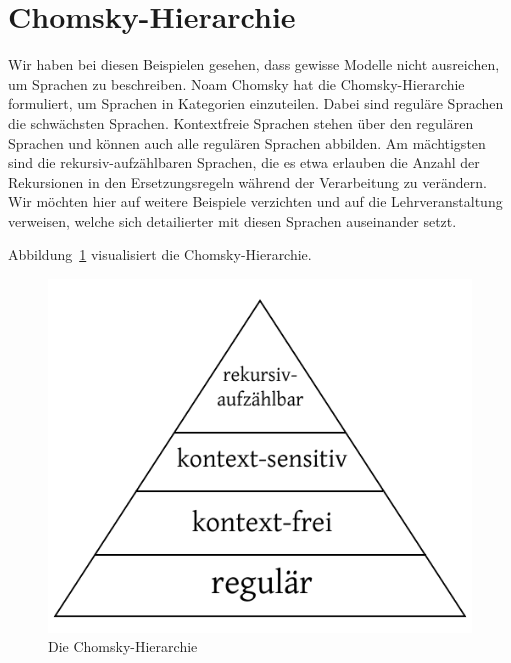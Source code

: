 \section{Chomsky-Hierarchie}
%
Wir haben bei diesen Beispielen gesehen, dass gewisse Modelle nicht ausreichen, um Sprachen zu beschreiben. Noam Chomsky hat die Chomsky-Hierarchie formuliert, um Sprachen in Kategorien einzuteilen. Dabei sind reguläre Sprachen die schwächsten Sprachen. Kontextfreie Sprachen stehen über den regulären Sprachen und können auch alle regulären Sprachen abbilden. Am mächtigsten sind die rekursiv-aufzählbaren Sprachen, die es etwa erlauben die Anzahl der Rekursionen in den Ersetzungsregeln während der Verarbeitung zu verändern. Wir möchten hier auf weitere Beispiele verzichten und auf die Lehrveranstaltung \courseswp{} verweisen, welche sich detailierter mit diesen Sprachen auseinander setzt.

Abbildung~\ref{fig:chomsky_hierarchy} visualisiert die Chomsky-Hierarchie.
%
\begin{figure}[h]
 \begin{center}
  \includegraphics{img/chomsky_hierarchy.pdf}
  \caption{Die Chomsky-Hierarchie}
  \label{fig:chomsky_hierarchy}
 \end{center}
\end{figure}
